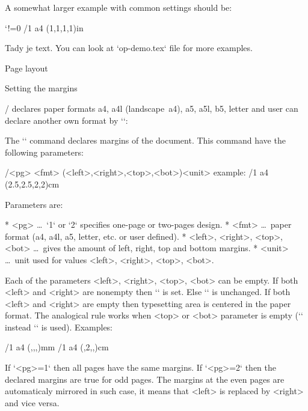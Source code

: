 A somewhat larger example with common settings should be:

\begtt \catcode`!=0
\fontfam[Termes]   %
\typosize[11/13]   %
\margins/1 a4 (1,1,1,1)in   %
\cslang            %

Tady je text.
\bye
\endtt
%
You can look at `op-demo.tex` file for more examples.


\sec Page layout

\secc[marg] Setting the margins

\OpTeX/ declares paper formats a4, a4l (landscape~a4), a5, a5l, b5, letter and
user can declare another own format by `\sdef`:

\begtt
{} 
\endtt

The `\margins` command declares margins of the document. This command have
the following parameters:

\begtt
\margins/<pg> <fmt> (<left>,<right>,<top>,<bot>)<unit>
  example:
\margins/1 a4 (2.5,2.5,2,2)cm
\endtt

Parameters are:

\begitems
* <pg> \dots\ `1` or `2` specifies one-page or two-pages design.
* <fmt> \dots\ paper format (a4, a4l, a5, letter, etc. or user defined).
* <left>, <right>, <top>, <bot> \dots\ gives the amount of left, right,
      top and bottom margins.
* <unit> \dots\ unit used for values <left>, <right>, <top>, <bot>.
\enditems

Each of the parameters <left>, <right>, <top>, <bot> can be empty.
If both <left> and <right> are nonempty then `\hsize` is set. Else `\hsize`
is unchanged. If both <left> and <right> are empty then typesetting area is
centered in the paper format. The analogical rule works when <top> or <bot>
parameter is empty (`\vsize` instead `\hsize` is used). Examples:

\begtt
\margins/1 a4 (,,,)mm   %
\margins/1 a4 (,2,,)cm  %
\endtt

If `<pg>=1` then all pages have the same margins. If `<pg>=2` then the
declared margins are true for odd pages. The margins at the even pages are
automaticaly mirrored in such case, it means that <left> is replaced by 
<right> and vice versa.

